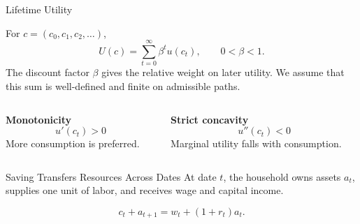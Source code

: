\documentclass[11pt,aspectratio=169,c]{beamer}
\begin{document}
\begin{frame}{Lifetime Utility}
  \begin{definitionbox}
    For $c=(c_0,c_1,c_2,\ldots)$,
    \[
      U(c)=\sum_{t=0}^{\infty}\beta^t u(c_t),
      \qquad 0<\beta<1.
    \]
    The discount factor $\beta$ gives the relative weight on later utility.
    We assume that this sum is well-defined and finite on admissible paths.
  \end{definitionbox}

  \vspace{.2em}
  \begin{columns}[t,onlytextwidth]
    \begin{column}{\tightcolumnwidth}
      \textbf{Monotonicity}
      \[
        u'(c_t)>0
      \]
      More consumption is preferred.
    \end{column}
    \hspace{\twocolumngutter}
    \begin{column}{\tightcolumnwidth}
      \textbf{Strict concavity}
      \[
        u''(c_t)<0
      \]
      Marginal utility falls with consumption.
    \end{column}
  \end{columns}
\end{frame}

\begin{frame}{Saving Transfers Resources Across Dates}
  At date $t$, the household owns assets $a_t$, supplies one unit of labor, and
  receives wage and capital income.

  \begin{definitionbox}
    \[
      c_t+a_{t+1}=w_t+(1+r_t)a_t.
    \]
  \end{definitionbox}

  \vspace{.25em}
  \centering
\end{frame}
\end{document}
